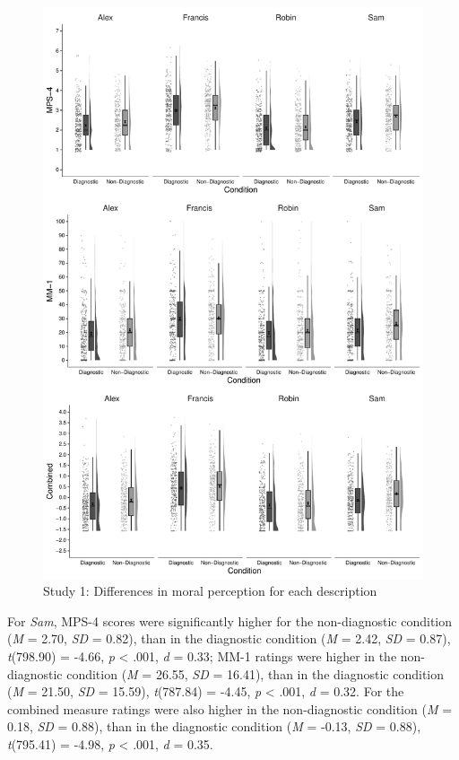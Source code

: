 \documentclass[
  man,floatsintext]{apa6}
\begin{document}
\begin{figure}[!p]
\includegraphics{Supplementary_files/figure-latex/S1allscenariosPlot-1} \caption{Study 1: Differences in moral perception for each description}\label{fig:S1allscenariosPlot}
\end{figure}

For \emph{Sam}, MPS-4 scores were significantly higher for the non-diagnostic condition (\emph{M} = 2.70, \emph{SD} = 0.82), than in the diagnostic condition (\emph{M} = 2.42, \emph{SD} = 0.87), \emph{t}(798.90) = -4.66, \emph{p} \textless{} .001, \emph{d} = 0.33; MM-1 ratings were higher in the non-diagnostic condition (\emph{M} = 26.55, \emph{SD} = 16.41), than in the diagnostic condition (\emph{M} = 21.50, \emph{SD} = 15.59), \emph{t}(787.84) = -4.45, \emph{p} \textless{} .001, \emph{d} = 0.32. For the combined measure ratings were also higher in the non-diagnostic condition (\emph{M} = 0.18, \emph{SD} = 0.88), than in the diagnostic condition (\emph{M} = -0.13, \emph{SD} = 0.88), \emph{t}(795.41) = -4.98, \emph{p} \textless{} .001, \emph{d} = 0.35.
\end{document}

